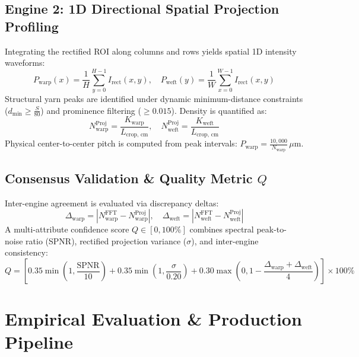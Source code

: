 \documentclass[11pt,a4paper]{article}
\begin{document}
\subsection{Engine 2: 1D Directional Spatial Projection Profiling}
Integrating the rectified ROI along columns and rows yields spatial 1D intensity waveforms:
\begin{equation}
    P_{\text{warp}}(x) = \frac{1}{H} \sum_{y=0}^{H-1} I_{\text{rect}}(x, y), \quad P_{\text{weft}}(y) = \frac{1}{W} \sum_{x=0}^{W-1} I_{\text{rect}}(x, y)
\end{equation}
Structural yarn peaks are identified under dynamic minimum-distance constraints ($d_{\min} \ge \frac{S}{80}$) and prominence filtering ($\ge 0.015$). Density is quantified as:
\begin{equation}
    N_{\text{warp}}^{\text{Proj}} = \frac{K_{\text{warp}}}{L_{\text{crop, cm}}}, \quad N_{\text{weft}}^{\text{Proj}} = \frac{K_{\text{weft}}}{L_{\text{crop, cm}}}
\end{equation}
Physical center-to-center pitch is computed from peak intervals: $P_{\text{warp}} = \frac{10,000}{N_{\text{warp}}}\,\mu\text{m}$.

\subsection{Consensus Validation \& Quality Metric $Q$}
Inter-engine agreement is evaluated via discrepancy deltas:
\begin{equation}
    \Delta_{\text{warp}} = \left| N_{\text{warp}}^{\text{FFT}} - N_{\text{warp}}^{\text{Proj}} \right|, \quad \Delta_{\text{weft}} = \left| N_{\text{weft}}^{\text{FFT}} - N_{\text{weft}}^{\text{Proj}} \right|
\end{equation}
A multi-attribute confidence score $Q \in [0, 100\%]$ combines spectral peak-to-noise ratio (SPNR), rectified projection variance ($\sigma$), and inter-engine consistency:
\begin{equation}
    Q = \left[ 0.35 \min\left(1, \frac{\text{SPNR}}{10}\right) + 0.35 \min\left(1, \frac{\sigma}{0.20}\right) + 0.30 \max\left(0, 1 - \frac{\Delta_{\text{warp}} + \Delta_{\text{weft}}}{4}\right) \right] \times 100\%
\end{equation}

\section{Empirical Evaluation \& Production Pipeline}
\end{document}

